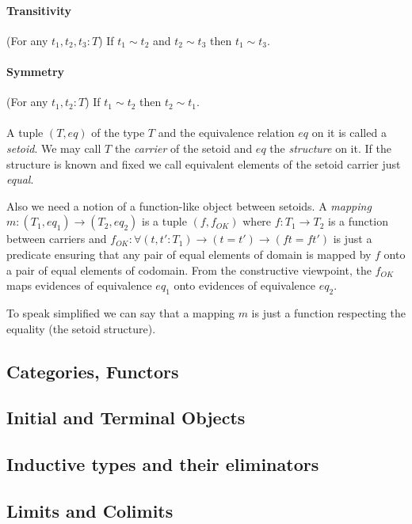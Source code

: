 \documentclass[11pt,oneside]{article}
\begin{document}
\paragraph{Transitivity}
(For any $t_1, t_2, t_3 : T$) If $t_1 \sim t_2$ and $t_2 \sim t_3$  then  $t_1 \sim t_3$.

\paragraph{Symmetry}
(For any $t_1, t_2 : T$) If $t_1 \sim t_2$ then $t_2 \sim t_1$.

\paragraph{}
A tuple $(T, eq)$ of the type $T$ and the equivalence relation $eq$ on it
is called a {\em setoid}.
We may call $T$ the {\em carrier} of the setoid and $eq$ the {\em structure} on it.
If the structure is known and fixed we call equivalent elements
of the setoid carrier just {\em equal}.

Also we need a notion of a function-like object between setoids.
A {\em mapping} $m : (T_1, eq_1) \rightarrow (T_2, eq_2)$ is a tuple
$(f, f_{OK})$ where $f : T_1 \rightarrow T_2$ is a function between carriers and
$f_{OK} : \forall (t, t' : T_1) \rightarrow (t = t') \rightarrow (f t = f t')$
is just a predicate ensuring that any pair of equal elements of domain
is mapped by $f$ onto a pair of equal elements of codomain.
From the constructive viewpoint, the $f_{OK}$ maps evidences of
equivalence $eq_1$ onto evidences of equivalence $eq_2$.

To speak simplified we can say that a mapping $m$ is just a function
respecting the equality (the setoid structure).

\subsection{Categories, Functors}

\subsection{Initial and Terminal Objects}

\subsection{Inductive types and their eliminators}

\subsection{Limits and Colimits}
\end{document}

